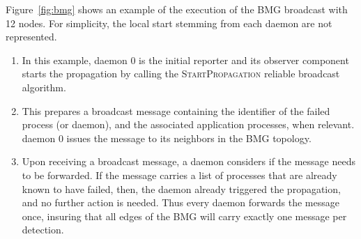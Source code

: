 \documentclass[sigconf]{acmart}
\begin{document}
Figure~\ref{fig:bmg} shows an example of the execution of the BMG broadcast
with 12 nodes. For simplicity, the local start stemming from each daemon are not
represented.

\begin{enumerate}
 \item In this example, daemon 0 is the initial reporter and its observer component starts the propagation by calling the \textsc{StartPropagation} reliable broadcast algorithm.
 \item This prepares a broadcast message containing the identifier of the
 failed process (or daemon), and the associated application processes, when relevant.
 daemon 0 issues the message to its neighbors in the BMG topology.
 \item Upon receiving a broadcast message, a daemon considers if the message needs
 to be forwarded. If the message carries a list of processes that are already known to
 have failed, then, the daemon already triggered the propagation, and no further
 action is needed. Thus every daemon forwards the message once, insuring that
 all edges of the BMG will carry exactly one message per detection.
\end{enumerate}
\end{document}
